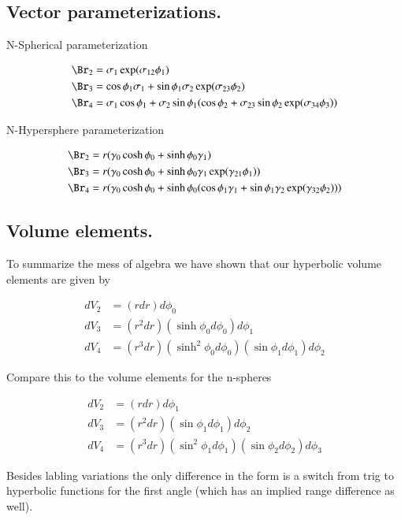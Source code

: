 \documentclass{article}
\begin{document}
\subsection{ Vector parameterizations. }

N-Spherical parameterization

\begin{align}
\Br_2 &= \sigma_1 \exp( \sigma_{12} \phi_1 ) \\
\Br_3 &= \cos\phi_1 \sigma_1 + \sin\phi_1 \sigma_2 \exp( \sigma_{23} \phi_2 ) \\
\Br_4 &= \sigma_1 \cos\phi_1 + \sigma_2 \sin\phi_1 (\cos\phi_2 + \sigma_{23} \sin\phi_2 \exp(\sigma_{34}\phi_3) ) 
\end{align}

N-Hypersphere parameterization

\begin{align}
\Br_2 &= r (\gamma_0 \cosh \phi_0 + \sinh\phi_0 \gamma_1) \\
\Br_3 &= r (\gamma_0 \cosh \phi_0 + \sinh\phi_0 \gamma_1 \exp( \gamma_{21} \phi_1 ) ) \\
\Br_4 &= r (\gamma_0 \cosh \phi_0 + \sinh\phi_0 ( \cos\phi_1 \gamma_1 + \sin\phi_1 \gamma_2 \exp( \gamma_{32} \phi_2 )) )
\end{align}

\subsection{ Volume elements. }

To summarize the mess of algebra we have shown that our hyperbolic volume elements are given by

\begin{align}
dV_2 &= \left(r dr\right) d\phi_0 \\
dV_3 &= \left(r^2 dr\right) \left(\sinh\phi_0 d\phi_0\right) d\phi_1 \\
dV_4 &= \left(r^3 dr\right) \left(\sinh^2 \phi_0 d\phi_0\right) \left(\sin\phi_1 d\phi_1\right) d\phi_2
\end{align}

Compare this to the volume elements for the n-spheres

\begin{align}
dV_2 &= \left(r dr\right) d\phi_1 \\
dV_3 &= \left(r^2 dr\right) \left(\sin\phi_1 d\phi_1\right) d\phi_2 \\
dV_4 &= \left(r^3 dr\right) \left(\sin^2\phi_1 d\phi_1\right) \left(\sin\phi_2 d\phi_2\right) d\phi_3 
\end{align}

Besides labling variations the only difference in the form is a switch from trig to hyperbolic functions for the first angle (which has an implied
range difference as well).



\end{document}
